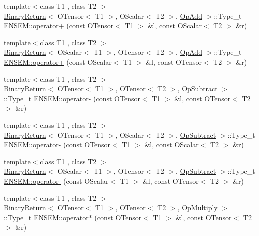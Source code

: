 \begin{DoxyCompactItemize}
\item 
{\footnotesize template$<$class T1 , class T2 $>$ }\\\mbox{\hyperlink{structBinaryReturn}{Binary\+Return}}$<$ O\+Tensor$<$ T1 $>$, O\+Scalar$<$ T2 $>$, \mbox{\hyperlink{structOpAdd}{Op\+Add}} $>$\+::Type\+\_\+t \mbox{\hyperlink{group__obstensor_gad2c9b97ae39bad4adefe3d2f480c0eb6}{E\+N\+S\+E\+M\+::operator+}} (const O\+Tensor$<$ T1 $>$ \&l, const O\+Scalar$<$ T2 $>$ \&r)
\item 
{\footnotesize template$<$class T1 , class T2 $>$ }\\\mbox{\hyperlink{structBinaryReturn}{Binary\+Return}}$<$ O\+Scalar$<$ T1 $>$, O\+Tensor$<$ T2 $>$, \mbox{\hyperlink{structOpAdd}{Op\+Add}} $>$\+::Type\+\_\+t \mbox{\hyperlink{group__obstensor_ga182db37f6b2f7005ba76d65458ac5424}{E\+N\+S\+E\+M\+::operator+}} (const O\+Scalar$<$ T1 $>$ \&l, const O\+Tensor$<$ T2 $>$ \&r)
\item 
{\footnotesize template$<$class T1 , class T2 $>$ }\\\mbox{\hyperlink{structBinaryReturn}{Binary\+Return}}$<$ O\+Tensor$<$ T1 $>$, O\+Tensor$<$ T2 $>$, \mbox{\hyperlink{structOpSubtract}{Op\+Subtract}} $>$\+::Type\+\_\+t \mbox{\hyperlink{group__obstensor_gacbd7414e163d7986e5bcfb720e77b733}{E\+N\+S\+E\+M\+::operator-\/}} (const O\+Tensor$<$ T1 $>$ \&l, const O\+Tensor$<$ T2 $>$ \&r)
\item 
{\footnotesize template$<$class T1 , class T2 $>$ }\\\mbox{\hyperlink{structBinaryReturn}{Binary\+Return}}$<$ O\+Tensor$<$ T1 $>$, O\+Scalar$<$ T2 $>$, \mbox{\hyperlink{structOpSubtract}{Op\+Subtract}} $>$\+::Type\+\_\+t \mbox{\hyperlink{group__obstensor_ga795d9d1bc036d1f9ddcab90e55085d67}{E\+N\+S\+E\+M\+::operator-\/}} (const O\+Tensor$<$ T1 $>$ \&l, const O\+Scalar$<$ T2 $>$ \&r)
\item 
{\footnotesize template$<$class T1 , class T2 $>$ }\\\mbox{\hyperlink{structBinaryReturn}{Binary\+Return}}$<$ O\+Scalar$<$ T1 $>$, O\+Tensor$<$ T2 $>$, \mbox{\hyperlink{structOpSubtract}{Op\+Subtract}} $>$\+::Type\+\_\+t \mbox{\hyperlink{group__obstensor_gadc53621528bc3dd8257b504bff4ec21e}{E\+N\+S\+E\+M\+::operator-\/}} (const O\+Scalar$<$ T1 $>$ \&l, const O\+Tensor$<$ T2 $>$ \&r)
\item 
{\footnotesize template$<$class T1 , class T2 $>$ }\\\mbox{\hyperlink{structBinaryReturn}{Binary\+Return}}$<$ O\+Tensor$<$ T1 $>$, O\+Tensor$<$ T2 $>$, \mbox{\hyperlink{structOpMultiply}{Op\+Multiply}} $>$\+::Type\+\_\+t \mbox{\hyperlink{group__obstensor_ga45559bd4234015a910a92c2eb80a69d5}{E\+N\+S\+E\+M\+::operator$\ast$}} (const O\+Tensor$<$ T1 $>$ \&l, const O\+Tensor$<$ T2 $>$ \&r)

\end{DoxyCompactItemize}
